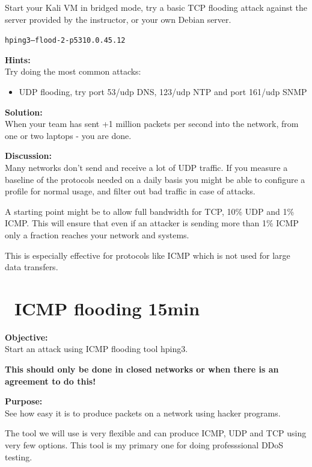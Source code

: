 \documentclass[a4paper,11pt,notitlepage]{report}
\begin{document}
Start your Kali VM in bridged mode, try a basic TCP flooding attack against the server provided by the instructor, or your own Debian server.

\begin{alltt}\footnotesize
hping3 --flood -2 -p 53 10.0.45.12
\end{alltt}



{\bf Hints:}\\

Try doing the most common attacks:
\begin{itemize}
\item UDP flooding, try port 53/udp DNS, 123/udp NTP and port 161/udp SNMP
\end{itemize}

{\bf Solution:}\\
When your team has sent +1 million packets per second into the network, from one or two laptops - you are done.

{\bf Discussion:}\\
Many networks don't send and receive a lot of UDP traffic. If you measure a baseline of the protocols needed on a daily basis you might be able to configure a profile for normal usage, and filter out bad traffic in case of attacks.

A starting point might be to allow full bandwidth for TCP, 10\% UDP and 1\% ICMP. This will ensure that even if an attacker is sending more than 1\% ICMP only a fraction reaches your network and systems.

This is especially effective for protocols like ICMP which is not used for large data transfers.

\chapter{\faInfoCircle\ ICMP flooding 15min}

{\bf Objective:}\\
Start an attack using ICMP flooding tool hping3.

{\color{red} \bf This should only be done in closed networks or when there is an agreement to do this!}

{\bf Purpose:}\\
See how easy it is to produce packets on a network using hacker programs.

The tool we will use is very flexible and can produce ICMP, UDP and TCP using very few options. This tool is my primary one for doing professsional DDoS testing.
\end{document}
